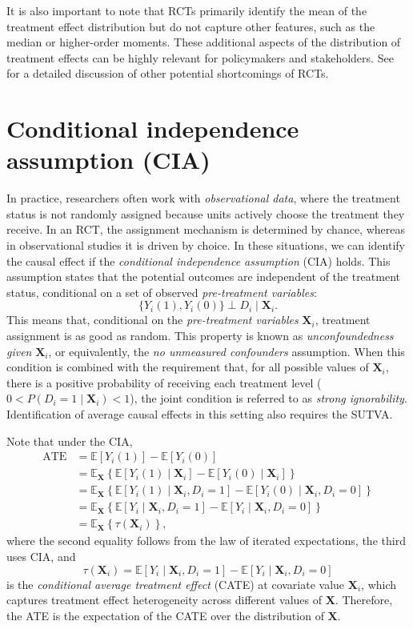 It is also important to note that RCTs primarily identify the mean of the treatment effect distribution but do not capture other features, such as the median or higher-order moments. These additional aspects of the distribution of treatment effects can be highly relevant for policymakers and stakeholders. See \cite{deaton2010instruments} for a detailed discussion of other potential shortcomings of RCTs.


\section{Conditional independence assumption (CIA)}

In practice, researchers often work with \textit{observational data}, where the treatment status is not randomly assigned because units actively choose the treatment they receive. In an RCT, the assignment mechanism is determined by chance, whereas in observational studies it is driven by choice. In these situations, we can identify the causal effect if the \textit{conditional independence assumption} (CIA) holds. This assumption states that the potential outcomes are independent of the treatment status, conditional on a set of observed  \textit{pre-treatment variables}:
\[
\{ Y_i(1), Y_i(0) \} \perp D_i \mid \mathbf{X}_i.
\]
This means that, conditional on the \textit{pre-treatment variables} $\mathbf{X}_i$, treatment assignment is as good as random. This property is known as \textit{unconfoundedness given} $\mathbf{X}_i$, or equivalently, the \textit{no unmeasured confounders} assumption. When this condition is combined with the requirement that, for all possible values of $\mathbf{X}_i$, there is a positive probability of receiving each treatment level ($0 < P(D_i = 1 \mid \mathbf{X}_i) < 1$), the joint condition is referred to as \textit{strong ignorability}. Identification of average causal effects in this setting also requires the SUTVA.

Note that under the CIA,
\begin{align*}
	\text{ATE} &= \mathbb{E}[Y_i(1)] - \mathbb{E}[Y_i(0)] \\
	&= \mathbb{E}_{\mathbf{X}}\left\{ \mathbb{E}[Y_i(1)\mid \mathbf{X}_i] - \mathbb{E}[Y_i(0)\mid \mathbf{X}_i] \right\} \\
	&= \mathbb{E}_{\mathbf{X}}\left\{ \mathbb{E}[Y_i(1)\mid \mathbf{X}_i, D_i=1] - \mathbb{E}[Y_i(0)\mid \mathbf{X}_i, D_i=0] \right\} \\
	&= \mathbb{E}_{\mathbf{X}}\left\{ \mathbb{E}[Y_i\mid \mathbf{X}_i, D_i=1] - \mathbb{E}[Y_i\mid \mathbf{X}_i, D_i=0] \right\} \\
	&= \mathbb{E}_{\mathbf{X}}\left\{ \tau(\mathbf{X}_i) \right\},
\end{align*}
where the second equality follows from the law of iterated expectations, the third uses CIA, and
\[
\tau(\mathbf{X}_i) = \mathbb{E}[Y_i \mid \mathbf{X}_i, D_i=1] - \mathbb{E}[Y_i \mid \mathbf{X}_i, D_i=0]
\]
is the \textit{conditional average treatment effect} (CATE) at covariate value $\mathbf{X}_i$, which captures treatment effect heterogeneity across different values of $\mathbf{X}$. Therefore, the ATE is the expectation of the CATE over the distribution of $\mathbf{X}$.

